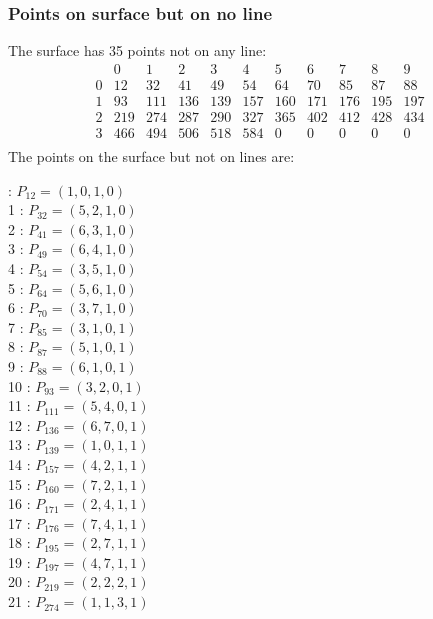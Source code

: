 \documentclass{article}
\begin{document}
{\subsubsection*{Points on surface but on no line}
The surface has 35 points not on any line:\\
$$
\begin{array}{r|*{10}{r}}
 & 0 & 1 & 2 & 3 & 4 & 5 & 6 & 7 & 8 & 9\\
\hline
0 & 12 & 32 & 41 & 49 & 54 & 64 & 70 & 85 & 87 & 88\\
1 & 93 & 111 & 136 & 139 & 157 & 160 & 171 & 176 & 195 & 197\\
2 & 219 & 274 & 287 & 290 & 327 & 365 & 402 & 412 & 428 & 434\\
3 & 466 & 494 & 506 & 518 & 584 & 0 & 0 & 0 & 0 & 0\\
\end{array}
$$
The points on the surface but not on lines are:\\
\begin{multicols}{2}
 : $P_{12}=( 1, 0, 1, 0 )$\\
1 : $P_{32}=( 5, 2, 1, 0 )$\\
2 : $P_{41}=( 6, 3, 1, 0 )$\\
3 : $P_{49}=( 6, 4, 1, 0 )$\\
4 : $P_{54}=( 3, 5, 1, 0 )$\\
5 : $P_{64}=( 5, 6, 1, 0 )$\\
6 : $P_{70}=( 3, 7, 1, 0 )$\\
7 : $P_{85}=( 3, 1, 0, 1 )$\\
8 : $P_{87}=( 5, 1, 0, 1 )$\\
9 : $P_{88}=( 6, 1, 0, 1 )$\\
10 : $P_{93}=( 3, 2, 0, 1 )$\\
11 : $P_{111}=( 5, 4, 0, 1 )$\\
12 : $P_{136}=( 6, 7, 0, 1 )$\\
13 : $P_{139}=( 1, 0, 1, 1 )$\\
14 : $P_{157}=( 4, 2, 1, 1 )$\\
15 : $P_{160}=( 7, 2, 1, 1 )$\\
16 : $P_{171}=( 2, 4, 1, 1 )$\\
17 : $P_{176}=( 7, 4, 1, 1 )$\\
18 : $P_{195}=( 2, 7, 1, 1 )$\\
19 : $P_{197}=( 4, 7, 1, 1 )$\\
20 : $P_{219}=( 2, 2, 2, 1 )$\\
21 : $P_{274}=( 1, 1, 3, 1 )$\\

\end{multicols}}
\end{document}
